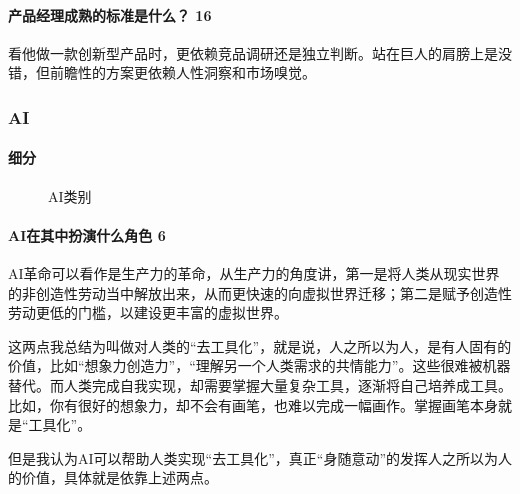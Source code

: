 \documentclass[letterpaper,11pt,english]{sphinxmanual}
\begin{document}
\paragraph{产品经理成熟的标准是什么？ 16\sphinxfootnotemark[65]}
\label{\detokenize{chapter_introduction/PM:id28}}%
\begin{footnotetext}[65]\sphinxAtStartFootnote
{}
%
\end{footnotetext}\ignorespaces 
看他做一款创新型产品时，更依赖竞品调研还是独立判断。站在巨人的肩膀上是没错，但前瞻性的方案更依赖人性洞察和市场嗅觉。


\subsubsection{AI}
\label{\detokenize{chapter_introduction/AI:ai}}\label{\detokenize{chapter_introduction/AI::doc}}

\paragraph{细分}
\label{\detokenize{chapter_introduction/AI:id1}}
\begin{figure}[H]
\centering
\capstart

\noindent{}
\caption{AI类别}\label{\detokenize{chapter_introduction/AI:id11}}\end{figure}


\paragraph{AI在其中扮演什么角色 6\sphinxfootnotemark[66]}
\label{\detokenize{chapter_introduction/AI:ai-6}}%
\begin{footnotetext}[66]\sphinxAtStartFootnote
{}
%
\end{footnotetext}\ignorespaces 
AI革命可以看作是生产力的革命，从生产力的角度讲，第一是将人类从现实世界的非创造性劳动当中解放出来，从而更快速的向虚拟世界迁移；第二是赋予创造性劳动更低的门槛，以建设更丰富的虚拟世界。

这两点我总结为叫做对人类的“去工具化”，就是说，人之所以为人，是有人固有的价值，比如“想象力创造力”，“理解另一个人类需求的共情能力”。这些很难被机器替代。而人类完成自我实现，却需要掌握大量复杂工具，逐渐将自己培养成工具。比如，你有很好的想象力，却不会有画笔，也难以完成一幅画作。掌握画笔本身就是“工具化”。

但是我认为AI可以帮助人类实现“去工具化”，真正“身随意动”的发挥人之所以为人的价值，具体就是依靠上述两点。
\end{document}
